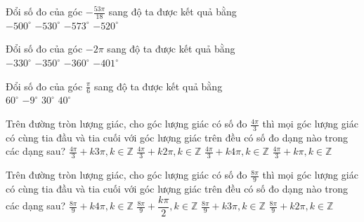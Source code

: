 \documentclass[12pt,a4paper]{article}
\begin{document}
\begin{ex}
 Đổi số đo của góc $- \frac{53 \pi}{18}$ sang độ ta được kết quả bằng\\ 
\choice
{ $-500^\circ$ }
   { \True $-530^\circ$ }
     { $-573^\circ$ }
    { $-520^\circ$ }
\end{ex}

\begin{ex}
 Đổi số đo của góc $- 2 \pi$ sang độ ta được kết quả bằng\\ 
\choice
{ $-330^\circ$ }
   { $-350^\circ$ }
     { \True $-360^\circ$ }
    { $-401^\circ$ }
\end{ex}

\begin{ex}
 Đổi số đo của góc $\frac{\pi}{6}$ sang độ ta được kết quả bằng\\ 
\choice
{ $60^\circ$ }
   { $-9^\circ$ }
     { \True $30^\circ$ }
    { $40^\circ$ }
\end{ex}

\begin{ex}
 Trên đường tròn lượng giác, cho góc lượng giác có số đo ${\frac{4 \pi}{3}}$ thì mọi góc lượng giác có cùng tia đầu và tia cuối với góc lượng giác trên đều có số đo dạng nào trong các dạng sau? 
\choice
{ $\frac{4 \pi}{3}+k3\pi, k\in \mathbb{Z}$ }
   { \True $\frac{4 \pi}{3}+k2\pi, k\in \mathbb{Z}$ }
     { $\frac{4 \pi}{3}+k4\pi, k\in \mathbb{Z}$ }
    { $\frac{4 \pi}{3}+k\pi, k\in \mathbb{Z}$ }
\end{ex}

\begin{ex}
 Trên đường tròn lượng giác, cho góc lượng giác có số đo ${\frac{8 \pi}{9}}$ thì mọi góc lượng giác có cùng tia đầu và tia cuối với góc lượng giác trên đều có số đo dạng nào trong các dạng sau? 
\choice
{ $\frac{8 \pi}{9}+k4\pi, k\in \mathbb{Z}$ }
   { $\frac{8 \pi}{9}+\dfrac{k\pi }{2}, k\in \mathbb{Z}$ }
     { $\frac{8 \pi}{9}+k3\pi, k\in \mathbb{Z}$ }
    { \True $\frac{8 \pi}{9}+k2\pi, k\in \mathbb{Z}$ }
\end{ex}
\end{document}
